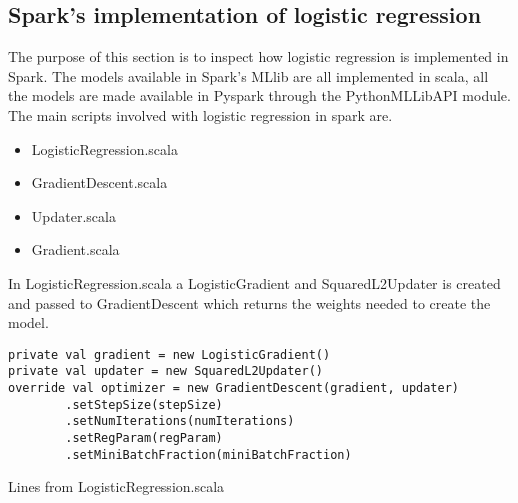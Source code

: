 \subsection{Spark's implementation of logistic regression}\label{sec:sparklogreg}
The purpose of this section is to inspect how logistic regression is implemented in Spark.  
The models available in Spark's MLlib are all implemented in scala, all the models are made available in Pyspark through the PythonMLLibAPI module. 
The main scripts involved with logistic regression in spark are. 
\begin{itemize}
\item LogisticRegression.scala
\item GradientDescent.scala
\item Updater.scala 
\item Gradient.scala
\end{itemize}
In LogisticRegression.scala a LogisticGradient and SquaredL2Updater is created and passed to GradientDescent which returns the weights needed to create the model. 

\begin{listing}[H]
\begin{verbatim}
private val gradient = new LogisticGradient()
private val updater = new SquaredL2Updater()
override val optimizer = new GradientDescent(gradient, updater)
        .setStepSize(stepSize)
        .setNumIterations(numIterations)
        .setRegParam(regParam)
        .setMiniBatchFraction(miniBatchFraction)
\end{verbatim}
\caption{Lines from LogisticRegression.scala}
\label{lst:gd_logreg}
\end{listing}

